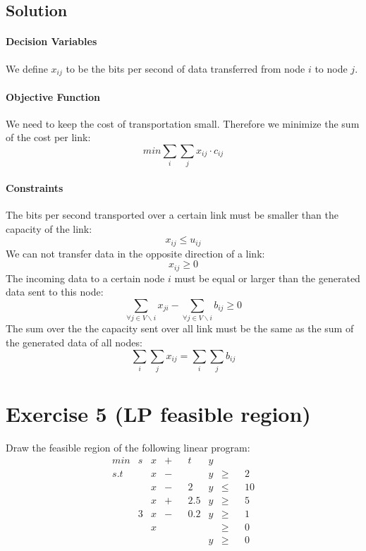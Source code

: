 \documentclass[a4paper, 12pt]{report}
\begin{document}
\subsection{Solution}

\paragraph{Decision Variables} We define $x_{ij}$ to be the bits per second of
data transferred from node $i$ to node $j$.

\paragraph{Objective Function} We need to keep the cost of transportation
small. Therefore we minimize the sum of the cost per link:
\[
    min ∑_{i}∑_{j} x_{ij} · c_{ij}
\]

\paragraph{Constraints} The bits per second transported over a certain link
must be smaller than the capacity of the link:
\[
    x_{ij} ≤ u_{ij}
\]
We can not transfer data in the opposite direction of a link:
\[
    x_{ij} ≥ 0
\]
The incoming data to a certain node $i$ must be equal or larger than the
generated data sent to this node:
\[
    ∑_{∀j ∈ V∖i} x_{ji} - ∑_{∀j ∈ V∖i} b_{ij} ≥ 0
\]
The sum over the the capacity sent over all link must be the same as the sum of
the generated data of all nodes:
\[
    ∑_{i}∑_{j}x_{ij} = ∑_{i}∑_{j}b_{ij}
\]

\section{Exercise 5 (LP feasible region)}

Draw the feasible region of the following linear program:
\begin{align*}
   & min &    s & x    & + &    & t   & y    &   &    &    &\\
   & s.t &      & x    & − &    &     & y    & ≥ &    & 2  &\\
   &     &      & x    & − &    & 2   & y    & ≤ &    & 10 &\\
   &     &      & x    & + &    & 2.5 & y    & ≥ &    & 5  &\\
   &     &    3 & x    & − &    & 0.2 & y    & ≥ &    & 1  &\\
   &     &      & x    &   &    &     &      & ≥ &    & 0  &\\
   &     &      &      &   &    &     & y    & ≥ &    & 0  &
\end{align*}
\end{document}
